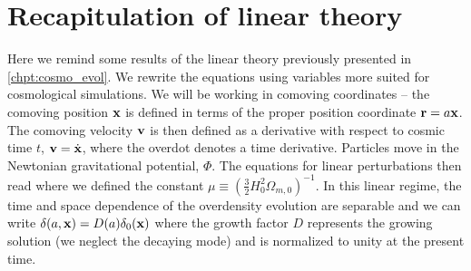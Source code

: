 \section{Recapitulation of linear theory}
Here we remind some results of the linear theory previously presented in \autoref{chpt:cosmo_evol}. We rewrite the equations using variables more suited for cosmological simulations. We will be working in comoving coordinates -- the comoving position $\mathbf x$ is defined in terms of the proper position coordinate $\mathbf r = a\mathbf x$. The comoving velocity $\mathbf v$ is then defined as a derivative with respect to cosmic time $t$, $\mathbf v = \dot{\mathbf x}$, where the overdot denotes a time derivative. Particles move in the Newtonian gravitational potential, $\Phi$. The equations for linear perturbations then read
where we defined the constant $\mu\equiv\left(\frac32 H_0^2\Omega_{m, 0}\right)^{-1}$. In this linear regime, the time and space dependence of the overdensity evolution are separable and we can write $\delta(a, \mathbf x)=D(a)\delta_0(\mathbf x)$ where the growth factor $D$ represents the growing solution (we neglect the decaying mode) and is normalized to unity at the present time.

